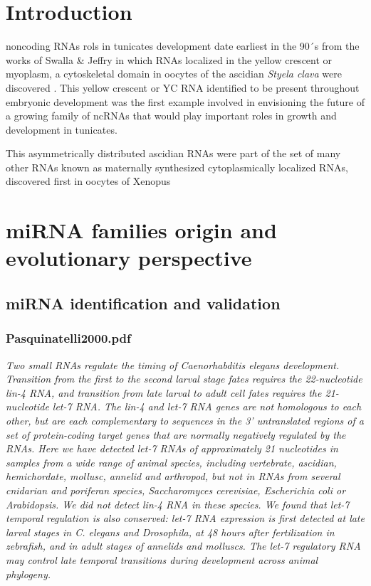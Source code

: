 \documentclass[graybox]{svmult}
\begin{document}
\section{Introduction}
\label{sec:1}

noncoding RNAs rols in tunicates development date earliest in the 90´s from the works of Swalla \& Jeffry in which RNAs localized in the yellow crescent or myoplasm, a cytoskeletal domain in oocytes of the ascidian \textit{Styela clava} were discovered \cite{Swalla1995}. This  yellow crescent or YC RNA identified to be present throughout embryonic development was the first example involved in envisioning the future of a growing family of ncRNAs that would play important roles in growth and development in tunicates\cite{Swalla1995}.

This asymmetrically distributed ascidian RNAs were part of the set of many other RNAs known as maternally synthesized cytoplasmically localized RNAs, discovered first in oocytes of Xenopus \cite{Bashirullah1998}

\section{miRNA families origin and evolutionary perspective}
\label{sec:2}

\subsection{miRNA identification and validation}
\subsubsection{Pasquinatelli2000.pdf}
\cite{Pasquinelli2000}
\textit{Two small RNAs regulate the timing of Caenorhabditis elegans development. Transition from the first to the second larval stage fates requires the 22-nucleotide lin-4 RNA, and transition from late larval to adult cell fates requires the 21-nucleotide let-7 RNA. The lin-4 and let-7 RNA genes are not homologous to each other, but are each complementary to sequences in the 3' untranslated regions of a set of protein-coding target genes that are normally negatively regulated by the RNAs. Here we have detected let-7 RNAs of approximately 21 nucleotides in samples from a wide range of animal species, including vertebrate, ascidian, hemichordate, mollusc, annelid and arthropod, but not in RNAs from several cnidarian and poriferan species, Saccharomyces cerevisiae, Escherichia coli or Arabidopsis. We did not detect lin-4 RNA in these species. We found that let-7 temporal regulation is also conserved: let-7 RNA expression is first detected at late larval stages in C. elegans and Drosophila, at 48 hours after fertilization in zebrafish, and in adult stages of annelids and molluscs. The let-7 regulatory RNA may control late temporal transitions during development across animal phylogeny.}
\end{document}
